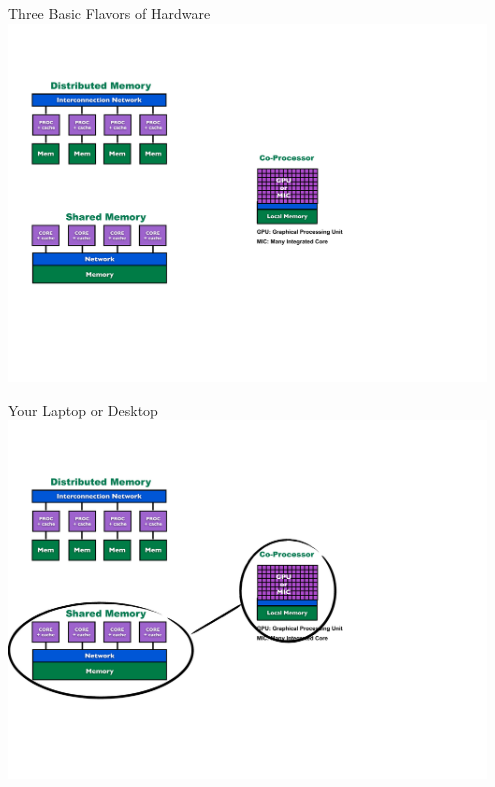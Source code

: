 \begin{frame}
\begin{block}{Three Basic Flavors of Hardware}
    \includegraphics[width=0.95\textwidth]{../common/pics/ParallelHardware1.pdf}
\end{block}
\end{frame}

\begin{frame}
\begin{block}{Your Laptop or Desktop}
    \includegraphics[width=0.95\textwidth]{../common/pics/ParallelHardware2.pdf}
\end{block}
\end{frame}

